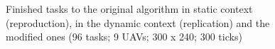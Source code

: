 \begin{figure}[!htb]
\centering
{}
\quad
{}
\quad
{}
\caption{Finished tasks to the original algorithm in static context (reproduction), in the dynamic context (replication) and the modified ones (96 tasks; 9 UAVs; 300 x 240; 300 ticks)}
\label{fig:box01}
\end{figure}

